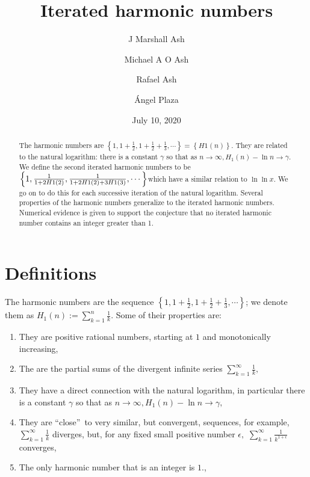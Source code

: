 \documentclass{article}
\begin{document}
\title{Iterated harmonic numbers}
\author{J Marshall Ash \and Michael A O Ash \and Rafael Ash \and \'{A}ngel
Plaza}
\date{July 10, 2020}
\maketitle

\begin{abstract}
The harmonic numbers are $\left\{ 1,1+\frac{1}{2},1+\frac{1}{2}+\frac{1}{3}%
,\cdots \right\} =\left\{ H1\left( n\right) \right\} $. They are related to
the natural logarithm: there is a constant $\gamma $ so that as $%
n\rightarrow \infty ,H_{1}\left( n\right) -\ln n\rightarrow \gamma .$ We
define the second iterated harmonic numbers to be $\left\{ 1,\frac{1}{%
1+2H1\left( 2\right) },\frac{1}{1+2H1\left( 2\right) +3H1\left( 3\right) }%
,\cdots \right\} $which have a similar relation to $\ln \ln x.$ We go on to
do this for each successive iteration of the natural logarithm. Several
properties of the harmonic numbers generalize to the iterated harmonic
numbers. Numerical evidence is given to support the conjecture that no
iterated harmonic number contains an integer greater than 1.
\end{abstract}

\section{Definitions}

The harmonic numbers are the sequence $\left\{ 1,1+\frac{1}{2},1+\frac{1}{2}+%
\frac{1}{3},\cdots \right\} $; we denote them as $H_{1}\left( n\right)
:=\sum_{k=1}^{n}\frac{1}{k}$. Some of their properties are:

\begin{enumerate}
\item They are positive rational numbers, starting at $1$ and monotonically
increasing,

\item The are the partial sums of the divergent infinite series $%
\sum_{k=1}^{\infty }\frac{1}{k},$

\item They have a direct connection with the natural logarithm, in
particular there is a constant $\gamma $ so that as $n\rightarrow \infty
,H_{1}\left( n\right) -\ln n\rightarrow \gamma ,$

\item They are \textquotedblleft close\textquotedblright\ to very similar,
but convergent, sequences, for example, $\sum_{k=1}^{\infty }\frac{1}{k}$
diverges, but, for any fixed small positive number $\epsilon ,$ $%
\sum_{k=1}^{\infty }\frac{1}{k^{1+\epsilon }}$ converges,

\item The only harmonic number that is an integer is $1$.,
\end{enumerate}
\end{document}
